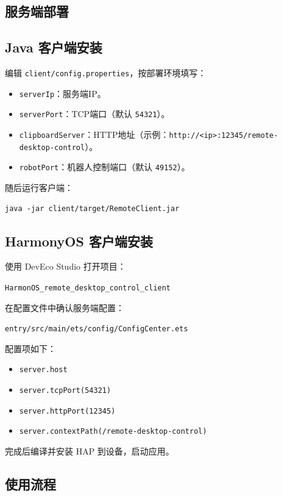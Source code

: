 \documentclass[UTF8,fontset=none]{ctexart}
\begin{document}
\subsection{服务端部署}

\subsection{Java 客户端安装}
编辑 \texttt{client/config.properties}，按部署环境填写：
\begin{itemize}
	\item \texttt{serverIp}：服务端IP。
	\item \texttt{serverPort}：TCP端口（默认 \texttt{54321}）。
	\item \texttt{clipboardServer}：HTTP地址（示例：\texttt{http://<ip>:12345/remote-desktop-control}）。
	\item \texttt{robotPort}：机器人控制端口（默认 \texttt{49152}）。
\end{itemize}
随后运行客户端：
\begin{verbatim}
java -jar client/target/RemoteClient.jar
\end{verbatim}

\subsection{HarmonyOS 客户端安装}
使用 DevEco Studio 打开项目：

\centerline{\texttt{HarmonOS\_remote\_desktop\_control\_client}}

在配置文件中确认服务端配置：

\centerline{\texttt{entry/src/main/ets/config/ConfigCenter.ets}}

配置项如下：
\begin{itemize}
	\item \texttt{server.host}
	\item \texttt{server.tcpPort(54321)}
	\item \texttt{server.httpPort(12345)}
	\item \texttt{server.contextPath(/remote-desktop-control)}
\end{itemize}
完成后编译并安装 HAP 到设备，启动应用。

\subsection{使用流程}
\end{document}
